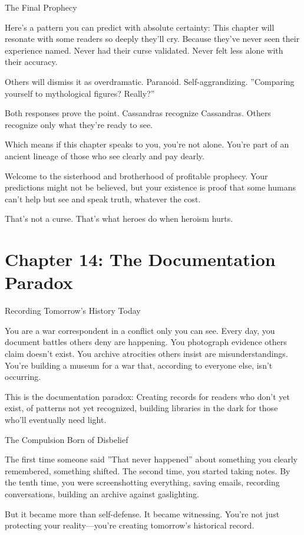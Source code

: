 \documentclass[12pt,oneside]{book}
\begin{document}
The Final Prophecy

Here's a pattern you can predict with absolute certainty: This chapter will resonate with some readers so deeply they'll cry. Because they've never seen their experience named. Never had their curse validated. Never felt less alone with their accuracy.

Others will dismiss it as overdramatic. Paranoid. Self-aggrandizing. ''Comparing yourself to mythological figures? Really?''

Both responses prove the point. Cassandras recognize Cassandras. Others recognize only what they're ready to see.

Which means if this chapter speaks to you, you're not alone. You're part of an ancient lineage of those who see clearly and pay dearly.

Welcome to the sisterhood and brotherhood of profitable prophecy. Your predictions might not be believed, but your existence is proof that some humans can't help but see and speak truth, whatever the cost.

That's not a curse. That's what heroes do when heroism hurts.

\chapter{Chapter 14: The Documentation Paradox}

Recording Tomorrow's History Today

You are a war correspondent in a conflict only you can see. Every day, you document battles others deny are happening. You photograph evidence others claim doesn't exist. You archive atrocities others insist are misunderstandings. You're building a museum for a war that, according to everyone else, isn't occurring.

This is the documentation paradox: Creating records for readers who don't yet exist, of patterns not yet recognized, building libraries in the dark for those who'll eventually need light.

The Compulsion Born of Disbelief

The first time someone said ''That never happened'' about something you clearly remembered, something shifted. The second time, you started taking notes. By the tenth time, you were screenshotting everything, saving emails, recording conversations, building an archive against gaslighting.

But it became more than self-defense. It became witnessing. You're not just protecting your reality---you're creating tomorrow's historical record.
\end{document}

